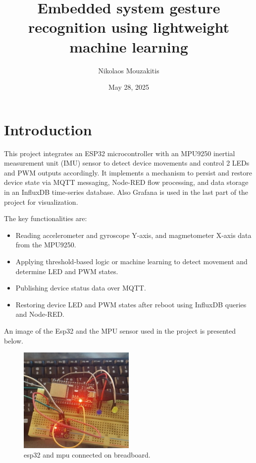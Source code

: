 \documentclass[a4paper,12pt]{article}
\title{Embedded system gesture recognition using lightweight machine learning}
\author{Nikolaos Mouzakitis}
\date{May 28, 2025}
\begin{document}
\maketitle

\section{Introduction}

This project integrates an ESP32 microcontroller with an MPU9250 
inertial measurement unit (IMU) sensor to detect device movements 
and control 2 LEDs and PWM outputs accordingly. 
It implements a mechanism to persist and restore device state 
via MQTT messaging, Node-RED flow processing, and data storage in an InfluxDB time-series database.
Also Grafana is used in the last part of the project for visualization.

The key 
functionalities are:

\begin{itemize}
    \item Reading accelerometer and gyroscope Y-axis, and magmetometer X-axis data from the MPU9250.
    \item Applying threshold-based logic or machine learning to detect movement and determine LED and PWM states.
    \item Publishing device status data over MQTT.
    \item Restoring device LED and PWM states after reboot using InfluxDB queries and Node-RED.
\end{itemize}


An image of the Esp32 and the MPU sensor used in the project is presented below.
		\begin{figure}[H]
			\centering
			\includegraphics[width=0.5\textwidth]{con.jpeg}
			\caption{esp32 and mpu connected on breadboard.}
			\label{fig1:}
		\end{figure}		
\end{document}
